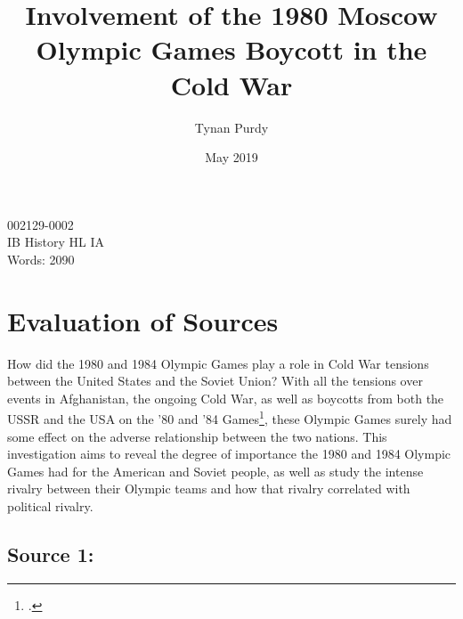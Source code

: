 \documentclass[12pt,letterpaper]{article}
\title{Involvement of the 1980 Moscow Olympic Games Boycott in the Cold War}
\author{Tynan Purdy}
\date{May 2019}
\begin{document}
\large
\parindent=0.5in

{\fontsize{12}{14.4}
	{\singlespace
	    \maketitle
	    \begin{center}
	    002129-0002 \\
	    \vspace{4mm}
	    IB History HL IA \\
	    \vspace{4mm}
	    Words: 2090 \\ %
	\end{center}
	}
}	

\newpage
\tableofcontents
{}
\newpage

\section{Evaluation of Sources}

How did the 1980 and 1984 Olympic Games play a role in Cold War tensions between the United States and the Soviet Union? With all the tensions over events in Afghanistan, the ongoing Cold War, as well as boycotts from both the USSR and the USA on the '80 and '84 Games\footcite[559]{guttmann_cold_1988}, these Olympic Games surely had some effect on the adverse relationship between the two nations. This investigation aims to reveal the degree of importance the 1980 and 1984 Olympic Games had for the American and Soviet people, as well as study the intense rivalry between their Olympic teams and how that rivalry correlated with political rivalry.

\subsection{Source 1: }
\end{document}

